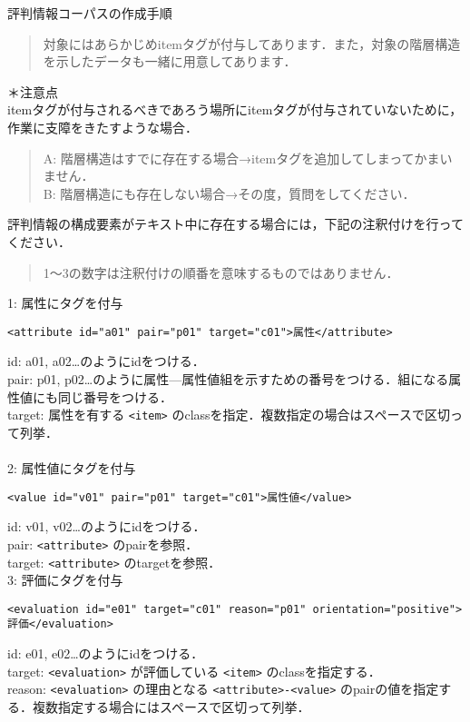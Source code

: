 \documentclass[japanese]{jnlp_1.4}
\begin{document}
\begin{screen}
評判情報コーパスの作成手順
\begin{quote}
対象にはあらかじめitemタグが付与してあります．また，対象の階層構造を示したデータも一緒に用意してあります．\\
\end{quote}
＊注意点\\
itemタグが付与されるべきであろう場所にitemタグが付与されていないために，作業に支障をきたすような場合．
\begin{quote}
A: 階層構造はすでに存在する場合→itemタグを追加してしまってかまいません．\\
B: 階層構造にも存在しない場合→その度，質問をしてください．
\end{quote}

評判情報の構成要素がテキスト中に存在する場合には，下記の注釈付けを行ってください．
\begin{quote}
1〜3の数字は注釈付けの順番を意味するものではありません．
\end{quote}

1: 属性にタグを付与
\begin{verbatim}<attribute id="a01" pair="p01" target="c01">属性</attribute>\end{verbatim}
id: a01, a02…のようにidをつける．\\
pair: p01, p02…のように属性—属性値組を示すための番号をつける．組になる属性値にも同じ番号をつける．\\
target: 属性を有する \verb|<item>| のclassを指定．複数指定の場合はスペースで区切って列挙．\\
\\
2: 属性値にタグを付与
\begin{verbatim}<value id="v01" pair="p01" target="c01">属性値</value>\end{verbatim}
id: v01, v02…のようにidをつける．\\
pair: \verb|<attribute>| のpairを参照．\\
target: \verb|<attribute>| のtargetを参照．\\
3: 評価にタグを付与
\begin{verbatim}<evaluation id="e01" target="c01" reason="p01" orientation="positive">評価</evaluation>\end{verbatim}
id: e01, e02…のようにidをつける．\\
target: \verb|<evaluation>| が評価している \verb|<item>| のclassを指定する．\\
reason: \verb|<evaluation>| の理由となる \verb|<attribute>-<value>| のpairの値を指定する．複数指定する場合にはスペースで区切って列挙．
\end{screen}
\end{document}
